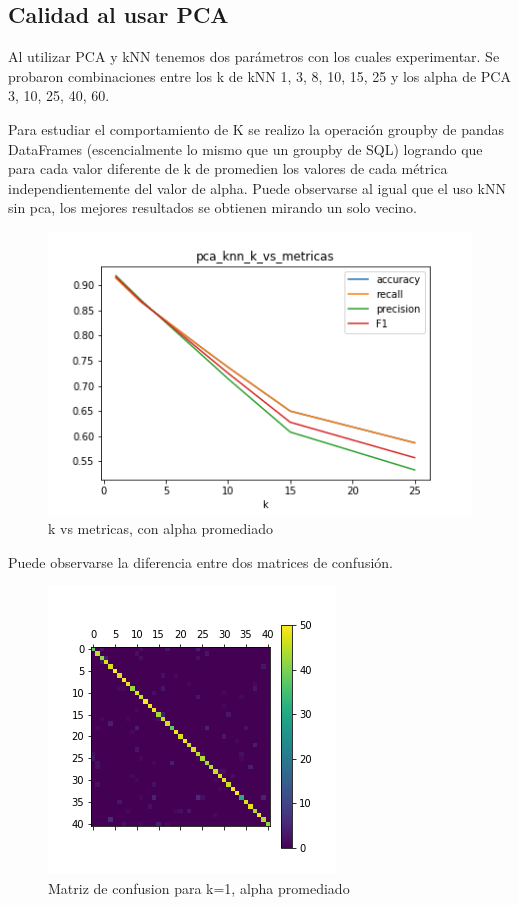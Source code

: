 \subsection{Calidad al usar PCA }
 
Al utilizar PCA y kNN tenemos dos parámetros con los cuales experimentar. Se probaron combinaciones entre los k de kNN 1, 3, 8, 10, 15, 25 y los alpha de PCA 3, 10, 25, 40, 60.
 
Para estudiar el comportamiento de K se realizo la operación groupby de pandas DataFrames (escencialmente lo mismo que un groupby de SQL) logrando que para cada valor diferente de k de promedien los valores de cada métrica independientemente del valor de alpha.  Puede observarse al igual que el uso kNN sin pca, los mejores resultados se obtienen mirando un solo vecino.
 
 
 
\begin{figure}[H]
    \begin{center}
      \includegraphics[width=0.6\columnwidth]{imagenes/charuli-des/pca_knn_k_vs_metricas.png}
      \caption{k vs metricas, con alpha promediado}
    \end{center}
\end{figure}
 
Puede observarse la diferencia entre dos matrices de confusión.
 
\begin{figure}[H]
    \begin{center}
      \includegraphics[width=0.6\columnwidth]{imagenes/charuli-des/pca_knn_confusion_matrix_for_k_1.png}
      \caption{Matriz de confusion para k=1, alpha promediado}
    \end{center}
\end{figure}
 
